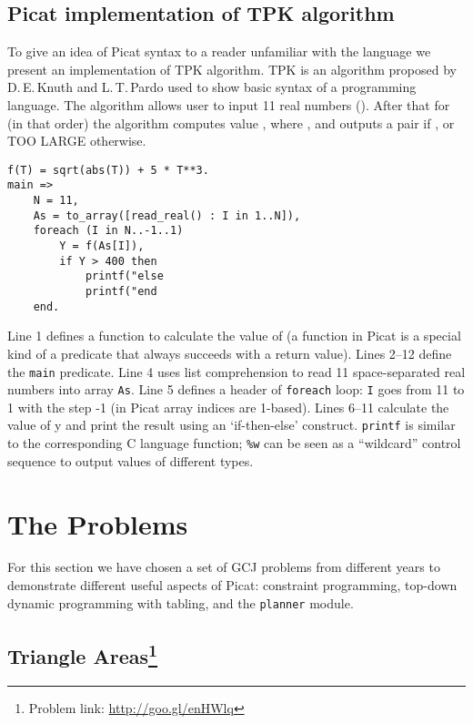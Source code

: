 \documentclass{llncs}
\begin{document}
\subsection*{Picat implementation of TPK algorithm}

To give an idea of Picat syntax to a reader unfamiliar with the language we present an implementation of TPK algorithm.
TPK is an algorithm proposed by D.\,E.\,Knuth and L.\,T.\,Pardo  \cite{knuth1976early} used to show basic syntax of a programming language.
The algorithm allows user to input 11 real numbers ().
After that for  (in that order) the algorithm computes value , where , and outputs a pair  if , or  TOO LARGE otherwise.

\begin{lstlisting}[caption={TPK algorithm in Picat}]
f(T) = sqrt(abs(T)) + 5 * T**3.
main =>
    N = 11,
    As = to_array([read_real() : I in 1..N]),
    foreach (I in N..-1..1)
        Y = f(As[I]),
        if Y > 400 then
            printf("else
            printf("end
    end.
\end{lstlisting}

Line 1 defines a function to calculate the value of  (a function in Picat is a special kind of a predicate that always succeeds with a return value).
Lines 2--12 define the \texttt{main} predicate.
Line 4 uses list comprehension to read 11 space-separated real numbers into array \texttt{As}.
Line 5 defines a header of \texttt{foreach} loop: \texttt{I} goes from 11 to 1 with the step -1 (in Picat array indices are 1-based).
Lines 6--11 calculate the value of y and print the result using an `if-then-else' construct.
\texttt{printf} is similar to the corresponding C language function; \texttt{\%w} can be seen as a ``wildcard'' control sequence to output values of different types.

\section{The Problems}
For this section we have chosen a set of GCJ problems from different years to demonstrate different useful aspects of Picat: constraint programming,
top-down dynamic programming with tabling, and the \texttt{planner} module.

\subsection*{Triangle Areas\footnote{Problem link: \url{http://goo.gl/enHWlq}}}
\end{document}
